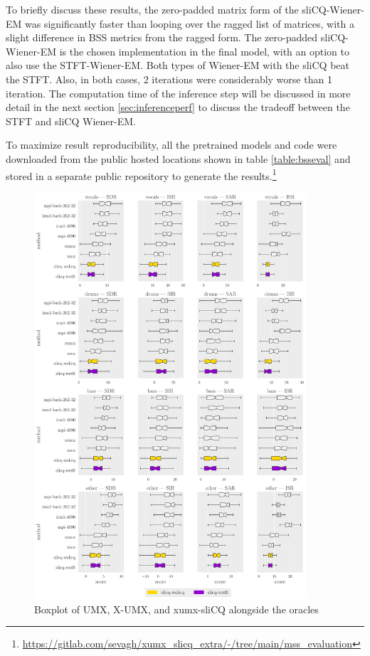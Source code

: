 \documentclass[report.tex]{subfiles}
\begin{document}
To briefly discuss these results, the zero-padded matrix form of the sliCQ-Wiener-EM was significantly faster than looping over the ragged list of matrices, with a slight difference in BSS metrics from the ragged form. The zero-padded sliCQ-Wiener-EM is the chosen implementation in the final model, with an option to also use the STFT-Wiener-EM. Both types of Wiener-EM with the sliCQ beat the STFT. Also, in both cases, 2 iterations were considerably worse than 1 iteration. The computation time of the inference step will be discussed in more detail in the next section \ref{sec:inferenceperf} to discuss the tradeoff between the STFT and sliCQ Wiener-EM.

To maximize result reproducibility, all the pretrained models and code were downloaded from the public hosted locations shown in table \ref{table:bsseval} and stored in a separate public repository to generate the results.\footnote{\url{https://gitlab.com/sevagh/xumx_slicq_extra/-/tree/main/mss_evaluation}}

\begin{figure}[ht]
	\centering
	\includegraphics[width=0.9\textwidth]{./images-bss/boxplot_full.pdf}
	\caption{Boxplot of UMX, X-UMX, and xumx-sliCQ alongside the oracles}
	\label{fig:bssboxplot}
\end{figure}
\end{document}
